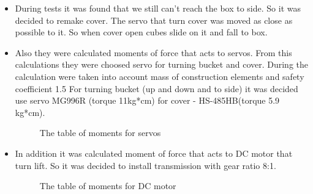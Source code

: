 \begin{itemize}
\item During tests it was found that we still can't reach the box to side. So it was decided to remake cover. The servo that turn cover was moved as close as possible to it. So when cover open cubes slide on it and fall to box. 

\item Also they were calculated moments of force that acts to servos. From this calculations they were choosed servo for turning bucket and cover. During the calculation were taken into account mass of construction elements and safety coefficient 1.5 For turning bucket (up and down and to side) it was decided use servo MG996R (torque 11kg*cm) for cover - HS-485HB(torque 5.9 kg*cm).
\begin{figure}[H]
	\begin{minipage}[h]{\linewidth}
		\caption{The table of moments for servos}
	\end{minipage}
\end{figure}
\item In addition it was calculated moment of force that acts to DC motor that turn lift. So it was decided to install transmission with gear ratio 8:1.
\begin{figure}[H]
	\begin{minipage}[h]{\linewidth}
		\caption{The table of moments for DC motor}
	\end{minipage}
\end{figure}
\end{itemize}
\fillpage

